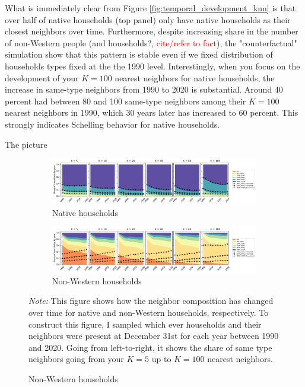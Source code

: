 \documentclass[main.tex]{subfiles}
\begin{document}
What is immediately clear from Figure \ref{fig:temporal_development_knn} is that over half of native households (top panel) only have native households as their closest neighbors over time. Furthermore, despite increasing share in the number of non-Western people (and households?, \textcolor{red}{cite/refer to fact}), the "counterfactual" simulation show that this pattern is stable even if we fixed distribution of households types fixed at the the 1990 level. Interestingly, when you focus on the development of your $K=100$ nearest neighbors for native households, the increase in same-type neighbors from 1990 to 2020 is substantial. Around 40 percent had between 80 and 100 same-type neighbors among their $K=100$ nearest neighbors in 1990, which 30 years later has increased to 60 percent. This strongly indicates Schelling behavior for native households.

The picture 

\begin{landscape}
\begin{figure}
    \centering
    \caption{Same type neighbor by $K$-proximity (1990-2020)}
    \label{fig:temporal_development_knn}
    \begin{subfigure}{1.5\textwidth}
    \includegraphics[width=\linewidth]{figs/temporal_knn_native_1990_2020_w_sim.pdf}
    \caption{Native households}
    \label{fig:temporal_knn_native_1990_2020}
    \end{subfigure}	
    \begin{subfigure}{1.5\textwidth}
    \includegraphics[width=\linewidth]{figs/temporal_knn_non_west_1990_2020_w_sim.pdf}
    \caption{Non-Western households}
    \label{fig:temporal_knn_non_west_1990_2020}
    \end{subfigure}	
\begin{tablenotes}
\item \footnotesize \textit{Note:} This figure shows how the neighbor composition has changed over time for native and non-Western households, respectively. To construct this figure, I sampled which ever households and their neighbors were present at December 31st for each year between 1990 and 2020. Going from left-to-right, it shows the share of same type neighbors going from your $K=5$ up to $K=100$ nearest neighbors.
\end{tablenotes}
\end{figure}
\end{landscape}
\end{document}
